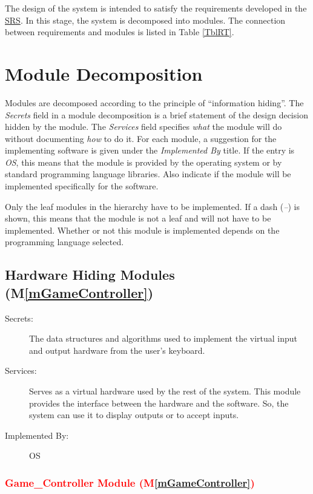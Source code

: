 \documentclass[12pt, titlepage]{article}
\newcommand{\mref}[1]{M\ref{#1}}
\begin{document}
The design of the system is intended to satisfy the requirements developed in
the \href{https://gitlab.cas.mcmaster.ca/jandric/super-refactored-mario-bros/-/blob/master/Doc/SRS/SRS.pdf}{SRS}. In this stage, the system is decomposed into modules. The connection between requirements and modules is listed in Table \ref{TblRT}.

\section{Module Decomposition} \label{SecMD}

Modules are decomposed according to the principle of ``information hiding''. The \emph{Secrets} field in a module
decomposition is a brief statement of the design decision hidden by the
module. The \emph{Services} field specifies \emph{what} the module will do
without documenting \emph{how} to do it. For each module, a suggestion for the
implementing software is given under the \emph{Implemented By} title. If the
entry is \emph{OS}, this means that the module is provided by the operating
system or by standard programming language libraries.  Also indicate if the
module will be implemented specifically for the software.

Only the leaf modules in the
hierarchy have to be implemented. If a dash (\emph{--}) is shown, this means
that the module is not a leaf and will not have to be implemented. Whether or
not this module is implemented depends on the programming language
selected.

\subsection{Hardware Hiding Modules (\mref{mGameController})}

\begin{description}
\item[Secrets:]The data structures and algorithms used to implement the virtual input and output
  hardware from the user's keyboard.
\item[Services:]Serves as a virtual hardware used by the rest of the
  system. This module provides the interface between the hardware and the
  software. So, the system can use it to display outputs or to accept inputs.
\item[Implemented By:] OS
\end{description}

\subsubsection{\textcolor{red}{Game\_Controller Module (\mref{mGameController})}}
\end{document}
